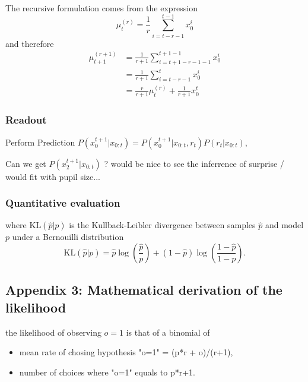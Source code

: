 \documentclass[12pt,english]{article}%
\newcommand{\KL}[2]{\text{KL}( #1 | #2 )}
\newcommand{\pa}[1]{\left( #1 \right)}
\newcommand{\eq}[1]{\begin{equation*}#1\end{equation*}}
\newcommand{\eqs}[1]{\begin{align*}#1\end{align*}}
\newcommand{\seeApp}[1]{Appendix~\ref{app:#1}}
\begin{document}
The recursive formulation comes from the expression
\eq{
\mu^{(r)}_{t} = \frac 1 r \sum_{i=t-r-1}^{t-1} x_0^i
}
and therefore
\eqs{
\mu^{(r+1)}_{t+1} 	&= \frac{1}{r+1} \sum_{i=t+1-r-1-1}^{t+1-1} x_0^i \\
					&= \frac{1}{r+1} \sum_{i=t-r-1}^{t} x_0^i \\
					&= \frac{r}{r+1} \mu^{(r)}_{t} + \frac{1}{r+1} x_0^t
}

\subsubsection{Readout}
\label{app:readout}

Perform Prediction $P (x_0^{t+1} | x_{0:t}) = P (x_0^{t+1}|x_{0:t} , r_t) P (r_t|x_{0:t})$,

Can we get  $P (x_2^{t+1} | x_{0:t}) $ ? would be nice to see the inferrence of surprise / would fit with pupil size...

\subsubsection{Quantitative evaluation}

where $\KL{\hat p}{p}$ is the Kullback-Leibler divergence between samples $\hat p$ and model $p$ under a Bernouilli distribution
\begin{equation}
\KL{\hat p}{p} = \hat{p} \log\pa{\frac{\hat p}{p}} + (1-\hat p) \log\pa{\frac{1-\hat p}{1-p}}.
\end{equation}


\subsection{Appendix 3: Mathematical derivation of the likelihood}
\label{app:likelihood}



the likelihood of observing $o=1$ is that of a binomial of
	\begin{itemize}
		\item  mean rate of chosing hypothesis "o=1" = (p*r + o)/(r+1),
		\item number of choices where  "o=1" equals to p*r+1.
	\end{itemize}
\end{document}
